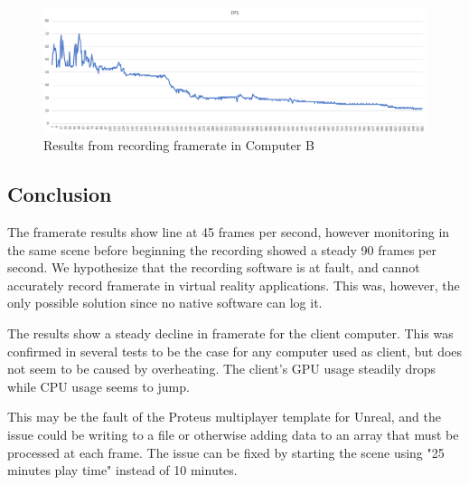 \documentclass[paper=a4, fontsize=11pt]{scrartcl} %
\numberwithin{equation}{section} %
\numberwithin{figure}{section} %
\numberwithin{table}{section} %
\begin{document}
\begin{figure}[H]
\centering
\includegraphics[scale=1]{B_fps.PNG}
\caption{Results from recording framerate in Computer B}
\end{figure}


\subsection{Conclusion}
The framerate results show line at 45 frames per second, however monitoring in the same scene before beginning the recording showed a steady 90 frames per second. We hypothesize that the recording software is at fault, and cannot accurately record framerate in virtual reality applications. This was, however, the only possible solution since no native software can log it. 

The results show a steady decline in framerate for the client computer. This was confirmed in several tests to be the case for any computer used as client, but does not seem to be caused by overheating. The client's GPU usage steadily drops while CPU usage seems to jump. 

This may be the fault of the Proteus multiplayer template for Unreal, and the issue could be writing to a file or otherwise adding data to an array that must be processed at each frame. The issue can be fixed by starting the scene using "25 minutes play time" instead of 10 minutes.

\end{document}
